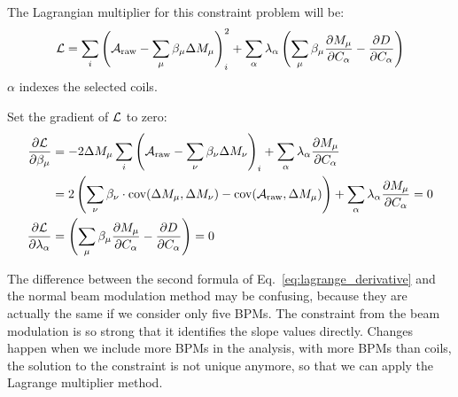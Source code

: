 The Lagrangian multiplier for this constraint problem will be:
\begin{equation}
    \mathcal{L} = \sum_i \left( \mathcal{A}_{\text{raw}} - \sum_\mu \beta_\mu \Delta M_\mu \right)_i^2+ \sum_\alpha \lambda_\alpha \left(\sum_\mu \beta_\mu \frac{\partial M_\mu}{\partial C_\alpha} - \frac{\partial D}{\partial C_\alpha} \right)
\end{equation}
$\alpha$ indexes the selected coils.

Set the gradient of $\mathcal{L}$ to zero:
\begin{equation}
    \begin{aligned}
	\frac{\partial \mathcal{L}}{\partial \beta_\mu} 
	&= -2\Delta M_\mu \sum_i \left( \mathcal{A}_{\text{raw}} 
	  - \sum_\nu \beta_\nu \Delta M_\nu \right)_i + \sum_\alpha \lambda_\alpha \frac{\partial M_\mu}{\partial C_\alpha}    \\
	&= 2 \left(\sum_\nu \beta_\nu \cdot \text{cov}(\Delta M_\mu, \Delta M_\nu) 
	  - \text{cov}(\mathcal{A}_{\text{raw}}, \Delta M_\mu) \right) + \sum_\alpha \lambda_\alpha \frac{\partial M_\mu}{\partial C_\alpha} = 0  \\
	\frac{\partial \mathcal{L}}{\partial \lambda_\alpha} &= \left( \sum_\mu \beta_\mu \frac{\partial M_\mu}{\partial C_\alpha} - \frac{\partial D}{\partial C_\alpha} \right) = 0\\
    \end{aligned}
    \label{eq:lagrange_derivative}
\end{equation}

The difference between the second formula of Eq.~\ref{eq:lagrange_derivative} and
the normal beam modulation method may be confusing, because they are actually
the same if we consider only five BPMs. The constraint from the beam modulation is so 
strong that it identifies the slope values directly. Changes happen when we
include more BPMs in the analysis, with more BPMs than coils, the solution
to the constraint is not unique anymore, so that we can apply the Lagrange multiplier
method.

